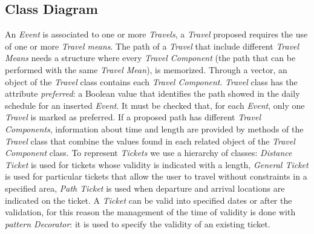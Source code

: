 \subsection{Class Diagram}
\noindent{}
\newline
An \textit{Event} is associated to one or more \textit{Travels}, a \textit{Travel} proposed requires the use of one or more \textit{Travel means}. The path of a \textit{Travel} that include different \textit{Travel Means} needs a structure where every \textit{Travel Component} (the path that can be performed with the same \textit{Travel Mean}), is memorized. Through a vector, an object of the \textit{Travel} class contains each \textit{Travel Component}.
\newline
\newline
\textit{Travel} class has the attribute \textit{preferred}: a Boolean value that identifies the path showed in the daily schedule for an inserted \textit{Event}. It must be checked that, for each \textit{Event}, only one \textit{Travel} is marked as preferred.
\newline
If a proposed path has different \textit{Travel Components}, information about time and length are provided by methods of the \textit{Travel} class that combine the values found in each related object of the \textit{Travel Component} class.
\newline
\newline
To represent \textit{Tickets} we use a hierarchy of classes: \textit{Distance Ticket} is used for tickets whose validity is indicated with a length, \textit{General Ticket} is used for particular tickets that allow the user to travel without constraints in a specified area, \textit{Path Ticket} is used when departure and arrival locations are indicated on the ticket. 
\newline
A \textit{Ticket} can be valid into specified dates or after the validation, for this reason the management of the time of validity is done with \textit{pattern Decorator}: it is used to specify the validity of an existing ticket.
